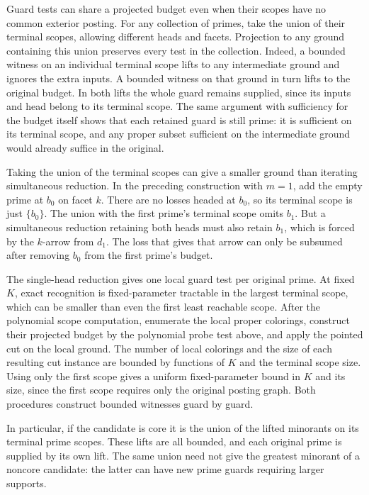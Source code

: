Guard tests can share a projected budget even when
their scopes have no common exterior posting. For
any collection of primes, take the union of their
terminal scopes, allowing different heads and
facets. Projection to any ground containing this
union preserves every test in the collection.
Indeed, a bounded witness on an individual terminal
scope lifts to any intermediate ground and ignores
the extra inputs. A bounded witness on that ground
in turn lifts to the original budget. In both lifts
the whole guard remains supplied, since its inputs
and head belong to its terminal scope. The same
argument with sufficiency for the budget itself
shows that each retained guard is still prime:
it is sufficient on its terminal scope, and any
proper subset sufficient on the intermediate
ground would already suffice in the original.

Taking the union of the terminal scopes can give
a smaller ground than iterating simultaneous
reduction. In the preceding construction with
$m=1$, add the empty prime at $b_0$ on facet $k$.
There are no losses headed at $b_0$, so its
terminal scope is just $\{b_0\}$. The union with
the first prime's terminal scope omits $b_1$.
But a simultaneous reduction retaining both
heads must also retain $b_1$, which is forced
by the $k$-arrow from $d_1$. The loss that
gives that arrow can only be subsumed after
removing $b_0$ from the first prime's budget.

The single-head reduction gives one local
guard test per original prime. At fixed $K$,
exact recognition is fixed-parameter tractable
in the largest terminal scope, which can be
smaller than even the first least reachable scope.
After the polynomial scope computation, enumerate
the local proper colorings, construct their
projected budget by the polynomial probe test above,
and apply the pointed cut on the local ground.
The number of local colorings and the size of
each resulting cut instance are bounded by
functions of $K$ and the terminal scope size.
Using only the first scope gives a uniform
fixed-parameter bound in $K$ and its size, since
the first scope requires only the original
posting graph. Both procedures construct bounded
witnesses guard by guard.

In particular, if the candidate is core it is the
union of the lifted minorants on its terminal
prime scopes. These lifts are all bounded, and
each original prime is supplied by its own lift.
The same union need not give the greatest minorant
of a noncore candidate: the latter can have new
prime guards requiring larger supports.


